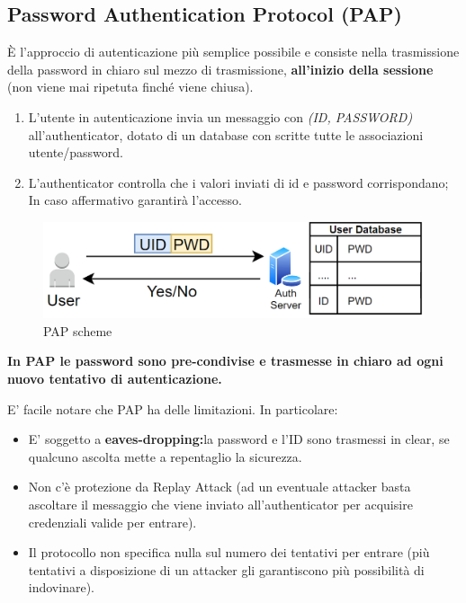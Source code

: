 \subsection{Password Authentication Protocol (PAP)}
È l'approccio di autenticazione più semplice possibile e consiste nella trasmissione della password in chiaro sul mezzo di trasmissione, \textbf{all'inizio della sessione} (non viene mai ripetuta finché viene chiusa).
\begin{proposition}\label{prop:pap}
\begin{enumerate}
    \item L'utente in autenticazione invia un messaggio con \textit{(ID, PASSWORD)} all'authenticator, dotato di un database con scritte tutte le associazioni utente/password.
    \item L'authenticator controlla che i valori inviati di id e password corrispondano; In caso affermativo garantirà l’accesso.
\end{enumerate}
\end{proposition}
\begin{figure}[ht]
    \centering
    \includegraphics{image/pap.png}
    \caption{PAP scheme}
    \label{fig:pap}
\end{figure}
\begin{note}
\textbf{In PAP le password sono pre-condivise e trasmesse in chiaro ad ogni nuovo tentativo di autenticazione.}
\end{note}\pagebreak
E' facile notare che PAP ha delle limitazioni. In particolare:
\begin{itemize}
    \item  E' soggetto a \textbf{eaves-dropping:}la password e l'ID sono trasmessi in clear, se qualcuno ascolta mette a repentaglio la sicurezza. 
    \item Non c'è protezione da Replay Attack (ad un eventuale attacker basta ascoltare il messaggio che viene inviato all'authenticator per acquisire credenziali valide per entrare). 
    \item Il protocollo non specifica nulla sul numero dei tentativi per entrare (più tentativi a disposizione di un attacker gli garantiscono più possibilità di indovinare).
\end{itemize}
